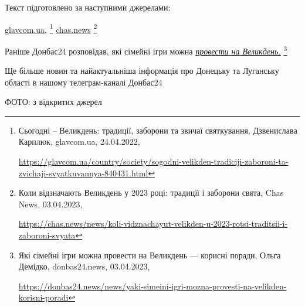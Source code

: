 Текст підготовлено за наступними джерелами:\par\noindent\href{https://glavcom.ua/country/society/sogodni-velikden-tradiciji-zaboroni-ta-zvichaji-svyatkuvannya-840431.html}{glavcom.ua},%
\footnote{Сьогодні – Великдень: традиції, заборони та звичаї святкування, Дзвенислава Карплюк, glavcom.ua, 24.04.2022, \par\url{https://glavcom.ua/country/society/sogodni-velikden-tradiciji-zaboroni-ta-zvichaji-svyatkuvannya-840431.html}}
\href{https://chas.news/news/koli-vidznachayut-velikden-u-2023-rotsi-traditsii-i-zaboroni-svyata}{chas.news}%
\footnote{Коли відзначають Великдень у 2023 році: традиції і заборони свята, Chas News, 03.04.2023, \par\url{https://chas.news/news/koli-vidznachayut-velikden-u-2023-rotsi-traditsii-i-zaboroni-svyata}}

Раніше Донбас24 розповідав, які сімейні ігри можна \href{https://donbas24.news/news/yaki-simeini-igri-mozna-provesti-na-velikden-korisni-poradi}{\emph{провести на Великдень.}}%
\footnote{Які сімейні ігри можна провести на Великдень — корисні поради, Ольга Демідко, donbas24.news, 03.04.2023, \par\url{https://donbas24.news/news/yaki-simeini-igri-mozna-provesti-na-velikden-korisni-poradi}}

Ще більше новин та найактуальніша інформація про Донецьку та Луганську області
в нашому телеграм-каналі Донбас24

ФОТО: з відкритих джерел

